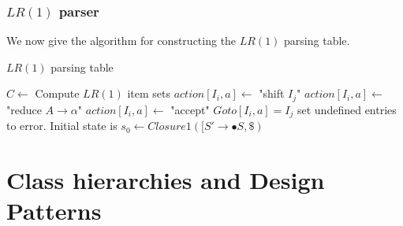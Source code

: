 \documentclass[•]{book}
\begin{document}
\subsection{$LR(1)$ parser}
We now give the algorithm for constructing the $LR(1)$ parsing table.
\begin{algorithm}
\caption{$LR(1)$ parsing table}
\begin{algorithmic}
\STATE $C \leftarrow$ Compute $LR(1)$ item sets
\STATE $action[I_i,a] \leftarrow$ "shift $I_j$"
\ENDIF
{}
\STATE $action[I_i,a] \leftarrow$ "reduce $A \rightarrow \alpha$"
\ENDIF
{}
\STATE $action[I_i,a] \leftarrow$ "accept"
\ENDIF
{}	
\STATE $Goto[I_i,a] = I_j$
\ENDIF
\STATE set undefined entries to error.
\STATE Initial state is $s_0 \leftarrow Closure1([S' \rightarrow \bullet S, \$)$
\end{algorithmic}
\end{algorithm}	

\chapter{Class hierarchies and Design Patterns}
\end{document}

